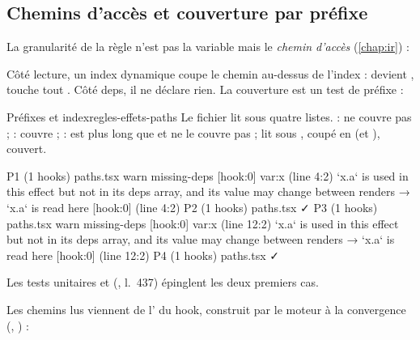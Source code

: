 \subsection{Chemins d'accès et couverture par préfixe}

La granularité de la règle n'est pas la variable mais le \emph{chemin d'accès} (\cref{chap:ir}) :


Côté lecture, un index dynamique coupe le chemin au-dessus de l'index :  devient , \og touche tout \fg{}. Côté deps, il ne déclare rien. La couverture est un test de préfixe :


\begin{exemple}{Préfixes et index}{regles-effets-paths}
Le fichier  lit  sous quatre listes.  : \code{[x.b]} ne couvre pas  ;  : \code{[x]} couvre  ;  : \code{[x.a.b]} est plus long que  et ne le couvre pas ;  lit  sous \code{[x.a, i]}, coupé en  (et ), couvert.
\begin{sortie}
  P1  (1 hooks)  paths.tsx
    warn   missing-deps  [hook:0]  var:x  (line 4:2)  `x.a` is used in this effect but not in its deps array, and its value may change between renders
       → `x.a` is read here [hook:0] (line 4:2)
  P2  (1 hooks)  paths.tsx  ✓
  P3  (1 hooks)  paths.tsx
    warn   missing-deps  [hook:0]  var:x  (line 12:2)  `x.a` is used in this effect but not in its deps array, and its value may change between renders
       → `x.a` is read here [hook:0] (line 12:2)
  P4  (1 hooks)  paths.tsx  ✓
\end{sortie}
Les tests unitaires  et  (, l.~437) épinglent les deux premiers cas.
\end{exemple}

Les chemins lus viennent de l' du hook, construit par le moteur à la convergence (, ) :


